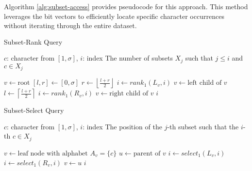 \noindent Algorithm \ref{alg:subset-access} provides pseudocode for this approach. This method leverages the bit vectors to efficiently locate specific character occurrences without iterating through the entire dataset.

\begin{algorithm}[h]
    \caption{Subset-Rank Query}
    \label{alg:subset-rank}
    \begin{algorithmic}[1]
        \Require $c$: character from $[1, \sigma]$, $i$: index
        \Ensure The number of subsets $X_j$ such that $j \leq i$ and $c \in X_j$
    \end{algorithmic}
    \begin{algorithmic}
        \State $v \gets \text{root}$
        \State $[l, r] \gets [0, \sigma]$ 
        \State $r \gets \left\lfloor \frac{l+r}{2} \right\rfloor$
        \State $i \gets rank_1(L_v, i)$
        \State $v \gets \text{left child of } v$
        \Else
        \State $l \gets \left\lceil \frac{l+r}{2} \right\rceil$
        \State $i \gets rank_1(R_v, i)$
        \State $v \gets \text{right child of } v$
        \EndIf
        \EndWhile
        \State \Return $i$
        \EndFunction
    \end{algorithmic}
\end{algorithm}

\begin{algorithm}[h]
    \caption{Subset-Select Query}
    \label{alg:subset-access}
    \begin{algorithmic}[1]
        \Require $c$: character from $[1, \sigma]$, $i$: index
        \Ensure The position of the $j$-th subset such that the $i$-th $c \in X_j$
    \end{algorithmic}
    \begin{algorithmic}
        \State $v \gets \text{leaf node with alphabet } A_v = \{c\}$
         
        \State $u \gets \text{parent of } v$
        \State $i \gets select_1(L_v, i)$
        \Else
        \State $i \gets select_1(R_v, i)$
        \EndIf
        \State $v \gets u$
        \EndWhile
        \State \Return $i$
        \EndFunction
    \end{algorithmic}
\end{algorithm}


